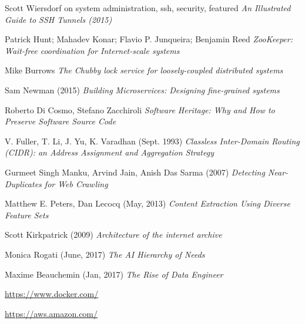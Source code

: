 \begin{thebibliography}{9}
Scott Wiersdorf on system administration, ssh, security, featured
\textit{An Illustrated Guide to SSH Tunnels (2015)}

Patrick Hunt; Mahadev Konar; Flavio P. Junqueira; Benjamin Reed
\textit{ZooKeeper: Wait-free coordination for Internet-scale systems}

Mike Burrows
\textit{The Chubby lock service for loosely-coupled distributed systems}

Sam Newman (2015)
\textit{Building Microservices: Designing fine-grained systems}

Roberto Di Cosmo, Stefano Zacchiroli
\textit{Software Heritage: Why and How to Preserve Software Source Code}

  V. Fuller, T. Li, J. Yu, K. Varadhan (Sept. 1993)
  \textit{Classless Inter-Domain Routing (CIDR): an Address Assignment and Aggregation Strategy}

  Gurmeet Singh Manku, Arvind Jain, Anish Das Sarma (2007)
  \textit{Detecting Near-Duplicates for Web Crawling}

  Matthew E. Peters, Dan Lecocq (May, 2013)
  \textit{Content Extraction Using Diverse Feature Sets}

  Scott Kirkpatrick (2009)
  \textit{Architecture of the internet archive}

  Monica Rogati (June, 2017)
  \textit{The AI Hierarchy of Needs}

  Maxime Beauchemin (Jan, 2017)
  \textit{The Rise of Data Engineer}

\url{https://www.docker.com/}

\url{https://aws.amazon.com/}

\end{thebibliography}
